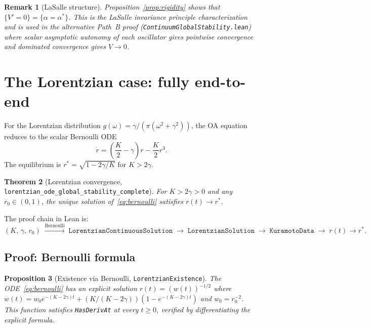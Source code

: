 \documentclass[11pt,a4paper]{article}
\newtheorem{theorem}{Theorem}[section]
\newtheorem{proposition}[theorem]{Proposition}
\newtheorem{remark}[theorem]{Remark}
\theoremstyle{definition}
\begin{document}
\begin{remark}[LaSalle structure]
Proposition~\ref{prop:rigidity} shows that $\{V' = 0\} = \{\alpha = \alpha^*\}$. This is the LaSalle invariance principle characterization and is used in the alternative Path~B proof (\texttt{ContinuumGlobalStability.lean}) where scalar asymptotic autonomy of each oscillator gives pointwise convergence and dominated convergence gives $V \to 0$.
\end{remark}

\section{The Lorentzian case: fully end-to-end}\label{sec:lorentzian}

For the Lorentzian distribution $g(\omega) = \gamma/(\pi(\omega^2+\gamma^2))$, the OA equation reduces to the scalar Bernoulli ODE
\begin{equation}\label{eq:bernoulli}
\dot{r} = \left(\frac{K}{2} - \gamma\right)r - \frac{K}{2}r^3.
\end{equation}
The equilibrium is $r^* = \sqrt{1 - 2\gamma/K}$ for $K > 2\gamma$.

\begin{theorem}[Lorentzian convergence, \texttt{lorentzian\_ode\_global\_stability\_complete}]\label{thm:lorentzian}
For $K > 2\gamma > 0$ and any $r_0 \in (0,1)$, the unique solution of~\eqref{eq:bernoulli} satisfies $r(t) \to r^*$.
\end{theorem}

The proof chain in Lean is:
\[
(K,\,\gamma,\,r_0) \;\xrightarrow{\text{Bernoulli}}\; \texttt{LorentzianContinuousSolution} \;\to\; \texttt{LorentzianSolution} \;\to\; \texttt{KuramotoData} \;\to\; r(t) \to r^*.
\]

\subsection{Proof: Bernoulli formula}\label{sec:bernoulli}

\begin{proposition}[Existence via Bernoulli, \texttt{LorentzianExistence}]\label{prop:bernoulli}
The ODE~\eqref{eq:bernoulli} has an explicit solution $r(t) = (w(t))^{-1/2}$ where $w(t) = w_0 e^{-(K-2\gamma)t} + (K/(K-2\gamma))(1 - e^{-(K-2\gamma)t})$ and $w_0 = r_0^{-2}$. This function satisfies \texttt{HasDerivAt} at every $t \geq 0$, verified by differentiating the explicit formula.
\end{proposition}
\end{document}
